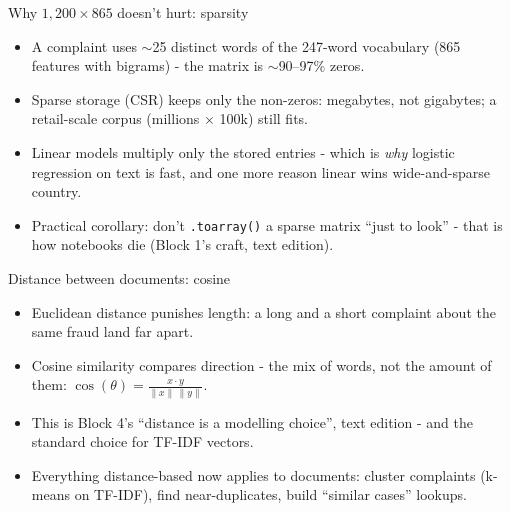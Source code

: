 \documentclass[10pt,aspectratio=169]{beamer}
\begin{document}
\begin{frame}{Why $1{,}200 \times 865$ doesn't hurt: sparsity}
  \begin{itemize}
    \item A complaint uses $\sim$25 distinct words of the 247-word
          vocabulary (865 features with bigrams) - the matrix is
          \alert{$\sim$90--97\% zeros}.
    \item Sparse storage (CSR) keeps only the non-zeros: megabytes, not
          gigabytes; a retail-scale corpus (millions $\times$ 100k) still
          fits.
    \item Linear models multiply only the stored entries - which is
          \emph{why} logistic regression on text is fast, and one more
          reason linear wins wide-and-sparse country.
    \item Practical corollary: don't \texttt{.toarray()} a sparse matrix
          ``just to look'' - that is how notebooks die (Block 1's
          craft, text edition).
  \end{itemize}
\end{frame}

\begin{frame}{Distance between documents: cosine}
  \begin{itemize}
    \item Euclidean distance punishes \alert{length}: a long and a short
          complaint about the same fraud land far apart.
    \item Cosine similarity compares \alert{direction} - the mix of
          words, not the amount of them:
          $\cos(\theta) = \frac{x \cdot y}{\lVert x \rVert\, \lVert y \rVert}$.
    \item This is Block 4's ``distance is a modelling choice'', text
          edition - and the standard choice for TF-IDF vectors.
    \item Everything distance-based now applies to documents: cluster
          complaints (k-means on TF-IDF), find near-duplicates, build
          ``similar cases'' lookups.
  \end{itemize}
\end{frame}
\end{document}
